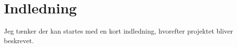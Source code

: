 \section*{Indledning}
Jeg tænker der kan startes med en kort indledning, hvorefter projektet bliver beskrevet. 




\begin{figure}[!th]
\centering
\begin{tikzpicture}[auto, node distance=1cm,>=latex']

\end{tikzpicture}
\caption[]{}
\label{fig:overview_openloop_PTS}
\end{figure}